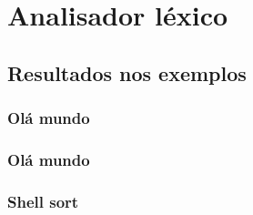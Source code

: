 \section{Analisador léxico}

\subsection{Resultados nos exemplos}

\subsubsection{Olá mundo}


\subsubsection{Olá mundo}


\subsubsection{Shell sort}


